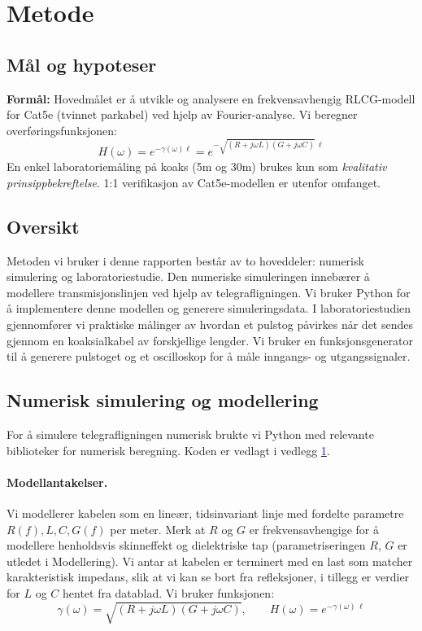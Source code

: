 \section{Metode}

\subsection{Mål og hypoteser}
\textbf{Formål:} Hovedmålet er å utvikle og analysere en frekvensavhengig RLCG-modell for Cat5e
(tvinnet parkabel) ved hjelp av Fourier-analyse. Vi beregner overføringsfunksjonen:
\[
H(\omega) = e^{-\gamma(\omega)\ell} = e^{-\sqrt{(R+j\omega L)(G+j\omega C)}\,\ell}
\]
En enkel laboratoriemåling på koaks (5m og 30m) brukes kun som \emph{kvalitativ
prinsippbekreftelse}. 1:1 verifikasjon av Cat5e-modellen er utenfor omfanget.

\subsection{Oversikt}
Metoden vi bruker i denne rapporten består av to hoveddeler: numerisk simulering og laboratoriestudie. Den numeriske simuleringen innebærer å modellere transmisjonslinjen ved hjelp av telegrafligningen. Vi bruker Python for å implementere denne modellen og generere simuleringsdata. I laboratoriestudien gjennomfører vi praktiske målinger av hvordan et pulstog påvirkes når det sendes gjennom en koaksialkabel av forskjellige lengder. Vi bruker en funksjonsgenerator til å generere pulstoget og et oscilloskop for å måle inngangs- og utgangssignaler.

\subsection{Numerisk simulering og modellering}
For å simulere telegrafligningen numerisk brukte vi Python med relevante biblioteker for numerisk beregning. Koden er vedlagt i vedlegg \hyperlink{vedlegg}{\textcolor{blue}{1}}.

\paragraph{Modellantakelser.}
Vi modellerer kabelen som en lineær, tidsinvariant linje med fordelte parametre $R(f),L,C,G(f)$ per meter. Merk at $R$ og $G$ er frekvensavhengige for å modellere henholdsvis skinneffekt og dielektriske tap (parametriseringen $R$, $G$ er utledet i Modellering). Vi antar at kabelen er terminert med en last som matcher karakteristisk impedans, slik at vi kan se bort fra refleksjoner, i tillegg er verdier for $L$ og $C$ hentet fra datablad. Vi bruker funksjonen:
\[
\gamma(\omega)=\sqrt{(R+j\omega L)(G+j\omega C)},\qquad
H(\omega)=e^{-\gamma(\omega)\,\ell}
\]

